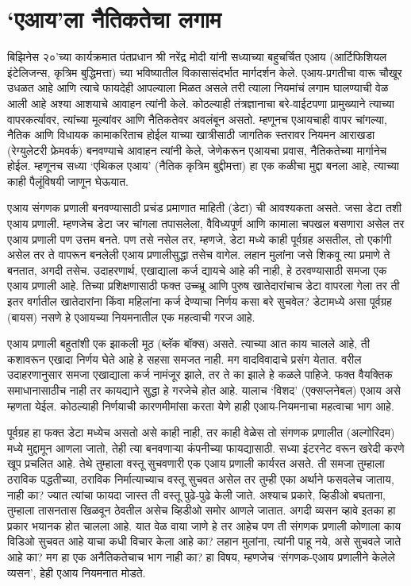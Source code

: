 \chapter{‘एआय’ला नैतिकतेचा लगाम}

बिझिनेस २०’च्या कार्यक्रमात पंतप्रधान श्री नरेंद्र मोदी यांनी सध्याच्या बहुचर्चित एआय (आर्टिफिशियल इंटेलिजन्स, कृत्रिम बुद्धिमत्ता) च्या भविष्यातील विकासासंदर्भात मार्गदर्शन केले. एआय-प्रगतीचा वारू चौखूर उधळत आहे आणि त्याचे फायदेही आपल्याला मिळत असले तरी त्याला नियमांचं लगाम घालण्याची वेळ आली आहे अश्या आशयाचे आवाहन त्यांनी केले. कोठल्याही तंत्रज्ञानाचा बरे-वाईटपणा प्रामुख्याने त्याच्या वापरकर्त्यावर, त्यांच्या मूल्यांवर आणि नैतिकतेवर अवलंबून असतो. म्हणूनच एआयचाही वापर चांगल्या, नैतिक आणि विधायक कामाकरिताच होईल याच्या खात्रीसाठी जागतिक स्तरावर नियमन आराखडा (रेग्युलेटरी फ्रेमवर्क) बनवण्याचे आवाहन त्यांनी केले, जेणेकरून एआयचा प्रवास, नैतिकतेच्या मार्गानेच होईल. म्हणूनच सध्या ‘एथिकल एआय’ (नैतिक कृत्रिम बुद्दीमत्ता) हा एक कळीचा मुद्दा बनला आहे, त्याच्या काही पैलूंविषयी जाणून घेऊयात.

एआय संगणक प्रणाली बनवण्यासाठी प्रचंड प्रमाणात माहिती (डेटा) ची आवश्यकता असते. जसा डेटा तशी एआय प्रणाली. म्हणजेच डेटा जर चांगला तपासलेला, वैविध्यपूर्ण आणि कामाला चपखल बसणारा असेल तर एआय प्रणाली पण उत्तम बनते. पण तसे नसेल तर, म्हणजे, डेटा मध्ये काही पूर्वग्रह असतील, तो एकांगी असेल तर ते वापरून बनलेली एआय प्रणालीसुद्धा तसेच वागेल. लहान मुलांना जसे शिकवू त्या प्रमाणे ते बनतात, अगदी तसेच. उदाहरणार्थ, एखाद्याला कर्ज द्यायचे आहे की नाही, हे ठरवण्यासाठी समजा एक एआय प्रणाली आहे. तिच्या प्रशिक्षणासाठी फक्त उच्च्भ्रू आणि पुरुष खातेदारांचाच डेटा वापरला गेला तर ती इतर वर्गातील खातेदारांना किंवा महिलांना कर्ज देण्याचा निर्णय कसा बरे सुचवेल? डेटामध्ये असा पूर्वग्रह (बायस) नसणे हे एआयच्या नियमनातील एक महत्वाची गरज आहे.

एआय प्रणाली बहुतांशी एक झाकली मूठ (ब्लॅक बॉक्स) असते. त्याच्या आत काय चालले आहे, ती कशावरून एखादा निर्णय घेते आहे हे सहसा समजत नाही. मग वादविवादाचे प्रसंग येतात. वरील उदाहरणानुसार समजा एखाद्याला कर्ज नामंजूर झाले, तर ते का झाले हे कळले पाहिजे. फक्त वैयक्तिक समाधानासाठीच नाही तर कायद्याने सुद्धा हे गरजेचे होत आहे. यालाच ‘विशद’ (एक्सप्लनेबल) एआय असे म्हणता येईल. कोठल्याही निर्णयाची कारणमीमांसा करता येणे हाही एआय-नियमनाचा महत्वाचा भाग आहे.

पूर्वग्रह हा फक्त डेटा मध्येच असतो असे काही नाही, तर काही वेळेस तो संगणक प्रणालीत (अल्गोरिदम) मध्ये मुद्दामून आणला जातो, तेही त्या बनवणाऱ्या कंपनीच्या फायद्यासाठी. सध्या इंटरनेट वरून खरेदी करणे खूप प्रचलित आहे. तेथे तुम्हाला वस्तू सुचवणारी एक एआय प्रणाली कार्यरत असते. ती समजा तुम्हाला ठराविक पद्धतीच्या, ठराविक निर्मात्याच्याच वस्तू सुचवत असेल तर तुम्ही एका अर्थाने फसवलेच जाताय, नाही का? ज्यात त्यांचा फायदा जास्त ती वस्तू पुढे-पुढे केली जाते. अश्याच प्रकारे, व्हिडीओ बघताना, तुम्हाला तासनतास खिळवून ठेवतील असेच व्हिडीओ समोर आणले जातात. अगदी व्यसन व्हावे इतका हा प्रकार भयानक होत चालला आहे. यात वेळ वाया जाणे हे तर आहेच पण ती संगणक प्रणाली कोणाला काय विडिओ सुचवत आहे याचा कधी विचार केला आहे का? लहान मुलांना, त्यांनी पाहू नये, असे सुचवले जाते आहे का? मग हा एक अनैतिकतेचाच भाग नाही का? हा विषय, म्हणजेच ‘संगणक-एआय प्रणालीने केलेले व्यसन’, हेही एआय नियमनात मोडते.

